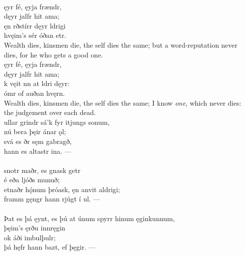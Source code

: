  \\

\bva {}ęyr fé, \hld {}ęyja frændr, \\%
\ind dęyr jalfr hit ama; \\%
ęn rðstírr \hld dęyr ldrigi \\%
\ind hvęim's sér óðan etr.\\%

\bvb Wealth dies, kinsmen die, the self dies the same; but a word-reputation never dies, for he who gets a good one. \\

\bva {}ęyr fé, \hld {}ęyja frændr, \\%
\ind dęyr jalfr hit ama; \\%
k vęit nn \hld at ldri dęyr: \\%
\ind {}ómr of auðan hvęrn.\\%

\bvb Wealth dies, kinsmen die, the self dies the same; I know \emph{one}, which never dies: the judgement over each dead. \\

\bva {}ullar grindr \hld sá'k fyr itjungs sonum, \\%
\ind nú bera þęir ánar ǫl; \\%
svá es ðr \hld sęm gabragð, \\%
\ind hann es altastr ina. —\\%

 \\

\bva {}snotr maðr, \hld es gnask getr \\%
\ind {}é eða ljóðs munuð; \\%
etnaðr hǫ́num þróask, \hld ęn anvit aldrigi; \\%
\ind framm gęngr hann rjúgt í ul. —\\%

 \\

\bva Þat es þá ęynt, \hld es þú at únum spyrr \hld hinum ęginkunnum, \\%
\ind þęim's ęrðu innręgin \\%
\ind ok áði imbulþulr; \\%
\ind þá hęfr hann bazt, ef þęgir. —\\%

